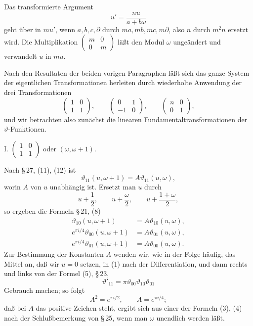 \documentclass[11pt]{article}
\providecommand{\tht}{\vartheta}
\begin{document}
Das transformierte Argument
\[
u'=\frac{nu}{a+b\omega}
\]
geht über in $mu'$, wenn $a,b,c,\partial$ durch $ma,mb,mc,m\partial$, also $n$ durch $m^2n$ ersetzt wird. Die Multiplikation $\begin{pmatrix}m&0\\0&m\end{pmatrix}$ läßt den Modul $\omega$ ungeändert und verwandelt $u$ in $mu$.

Nach den Resultaten der beiden vorigen Paragraphen läßt sich das ganze System der eigentlichen Transformationen herleiten durch wiederholte Anwendung der drei Transformationen
\[
\begin{pmatrix}1&0\\1&1\end{pmatrix},
\qquad
\begin{pmatrix}0&1\\-1&0\end{pmatrix},
\qquad
\begin{pmatrix}n&0\\0&1\end{pmatrix},
\]
und wir betrachten also zunächst die linearen Fundamentaltransformationen der $\tht$-Funktionen.

I. $\begin{pmatrix}1&0\\1&1\end{pmatrix}$ oder $(\omega,\omega+1)$.

Nach \S\,27, (11), (12) ist
\begin{equation}
\tht_{11}(u,\omega+1)=A\tht_{11}(u,\omega), \tag{1}
\end{equation}
worin $A$ von $u$ unabhängig ist. Ersetzt man $u$ durch
\[
u+\frac12,
\qquad u+\frac{\omega}{2},
\qquad u+\frac{1+\omega}{2},
\]
so ergeben die Formeln \S\,21, (8)
\begin{align}
\tht_{10}(u,\omega+1)&=A\tht_{10}(u,\omega), \tag{2}\\
e^{\pi i/4}\tht_{00}(u,\omega+1)&=A\tht_{01}(u,\omega), \tag{3}\\
e^{\pi i/4}\tht_{01}(u,\omega+1)&=A\tht_{00}(u,\omega). \tag{4}
\end{align}
Zur Bestimmung der Konstanten $A$ wenden wir, wie in der Folge häufig, das Mittel an, daß wir $u=0$ setzen, in (1) nach der Differentiation, und dann rechts und links von der Formel (5), \S\,23,
\begin{equation}
\tht'_{11}=\pi\tht_{00}\tht_{10}\tht_{01} \tag{5}
\end{equation}
Gebrauch machen; so folgt
\[
A^2=e^{\pi i/2},
\qquad
A=e^{\pi i/4};
\]
daß bei $A$ das positive Zeichen steht, ergibt sich aus einer der Formeln (3), (4) nach der Schlußbemerkung von \S\,25, wenn man $\omega$ unendlich werden läßt.
\end{document}
